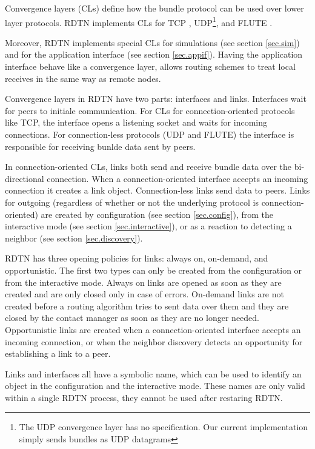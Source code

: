 \documentclass{article}
\begin{document}
Convergence layers (CLs) define how the bundle protocol can be used over lower
layer protocols. RDTN implements CLs for TCP \cite{dtn-tcp-cl}, UDP\footnote{The UDP
convergence layer has no specification. Our current implementation simply sends
bundles as UDP datagrams}, and FLUTE \cite{uni-dtn}.

Moreover, RDTN implements special CLs for simulations (see section
\ref{sec.sim}) and for the application interface (see section \ref{sec.appif}).
Having the application interface behave like a convergence layer, allows routing
schemes to treat local receives in the same way as remote nodes.

Convergence layers in RDTN have two parts: interfaces and links. Interfaces wait
for peers to initiale communication. For CLs for connection-oriented protocols
like TCP, the interface opens a listening socket and waits for incoming
connections. For connection-less protocols (UDP and FLUTE) the interface is
responsible for receiving bunlde data sent by peers.

In connection-oriented CLs, links both send and receive bundle data over the
bi-directional connection. When a connection-oriented interface accepts an
incoming connection it creates a link object. Connection-less links send data to
peers. Links for outgoing (regardless of whether or not the underlying protocol
is connection-oriented) are created by configuration (see section
\ref{sec.config}), from the interactive mode (see section
\ref{sec.interactive}), or as a reaction to detecting a neighbor (see section
\ref{sec.discovery}).

RDTN has three opening policies for links: always on, on-demand, and
opportunistic. The first two types can only be created from the
configuration or from the interactive mode. Always on links are opened as soon
as they are created and are only closed only in case of errors. On-demand links
are not created before a routing algorithm tries to sent data over them and they
are closed by the contact manager as soon as they are no longer needed.
Opportunistic links are created when a connection-oriented interface accepts an
incoming connection, or when the neighbor discovery detects an opportunity for
establishing a link to a peer.

Links and interfaces all have a symbolic name, which can be used to identify an
object in the configuration and the interactive mode. These names are only valid
within a single RDTN process, they cannot be used after restaring RDTN.
\end{document}
